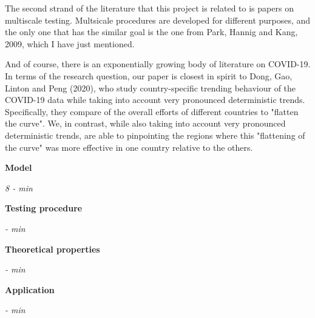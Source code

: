 \documentclass[a4paper,12pt]{article}
\begin{document}
The second strand of the literature that this project is related to is papers on multiscale testing. Multsicale procedures are developed for different purposes, and the only one that has the similar goal is the one from Park, Hannig and Kang, 2009, which I have just mentioned.

And of course, there is an exponentially growing body of literature on COVID-19. In terms of the research question, our paper is closest in spirit to Dong, Gao, Linton and Peng (2020), who study country-specific trending behaviour of the COVID-19 data while taking into account very pronounced deterministic trends. Specifically, they compare of the overall efforts of different countries to "flatten the curve". We, in contrast, while also taking into account very pronounced deterministic trends, are able to pinpointing the regions where this "flattening of the curve" was more effective in one country relative to the others. 

\textbf{Model}

\emph{8 -  min}

\textbf{Testing procedure}

\emph{ -  min}

\textbf{Theoretical properties}

\emph{ -  min}

\textbf{Application}

 \emph{ -  min}
\end{document}
